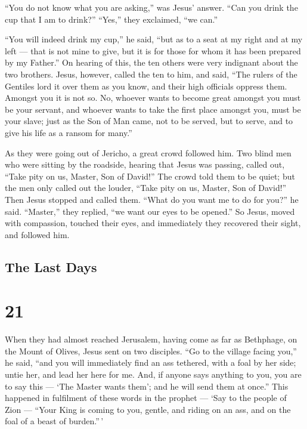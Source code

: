  ``You do not know what you are asking,'' was Jesus'
answer. ``Can you drink the cup that I am to drink?'' ``Yes,'' they
exclaimed, ``we can.''

 ``You will indeed drink my cup,'' he said, ``but as to a
seat at my right and at my left --- that is not mine to give, but it is
for those for whom it has been prepared by my Father.''  On
hearing of this, the ten others were very indignant about the two
brothers.  Jesus, however, called the ten to him, and said,
``The rulers of the Gentiles lord it over them as you know, and their
high officials oppress them.  Amongst you it is not so.
 No, whoever wants to become great amongst you must be your
servant, and whoever wants to take the first place amongst you, must be
your slave;  just as the Son of Man came, not to be served,
but to serve, and to give his life as a ransom for many.''

 As they were going out of Jericho, a great crowd followed
him.  Two blind men who were sitting by the roadside,
hearing that Jesus was passing, called out, ``Take pity on us, Master,
Son of David!''  The crowd told them to be quiet; but the
men only called out the louder, ``Take pity on us, Master, Son of
David!''  Then Jesus stopped and called them. ``What do you
want me to do for you?'' he said.  ``Master,'' they
replied, ``we want our eyes to be opened.''  So Jesus,
moved with compassion, touched their eyes, and immediately they
recovered their sight, and followed him.

\hypertarget{the-last-days}{%
\subsection{The Last Days}\label{the-last-days}}

\hypertarget{section-20}{%
\section{21}\label{section-20}}

 When they had almost reached Jerusalem, having come as far
as Bethphage, on the Mount of Olives, Jesus sent on two disciples.
 ``Go to the village facing you,'' he said, ``and you will
immediately find an ass tethered, with a foal by her side; untie her,
and lead her here for me.  And, if anyone says anything to
you, you are to say this --- `The Master wants them'; and he will send
them at once.''  This happened in fulfilment of these words
in the prophet ---  `Say to the people of Zion --- ``Your
King is coming to you, gentle, and riding on an ass, and on the foal of
a beast of burden.''\,'

